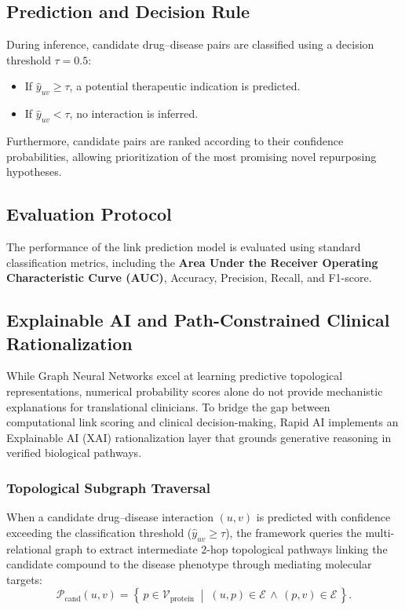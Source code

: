 \documentclass[conference,a4paper]{IEEEtran}
\begin{document}
\subsection{Prediction and Decision Rule}
During inference, candidate drug--disease pairs are classified using a decision threshold $\tau = 0.5$:
\begin{itemize}
    \item If $\hat{y}_{uv} \ge \tau$, a potential therapeutic indication is predicted.
    \item If $\hat{y}_{uv} < \tau$, no interaction is inferred.
\end{itemize}
Furthermore, candidate pairs are ranked according to their confidence probabilities, allowing prioritization of the most promising novel repurposing hypotheses.

\subsection{Evaluation Protocol}
The performance of the link prediction model is evaluated using standard classification metrics, including the \textbf{Area Under the Receiver Operating Characteristic Curve (AUC)}, Accuracy, Precision, Recall, and F1-score.

\subsection{Explainable AI and Path-Constrained Clinical Rationalization}
\label{sec:xai}
While Graph Neural Networks excel at learning predictive topological representations, numerical probability scores alone do not provide mechanistic explanations for translational clinicians. To bridge the gap between computational link scoring and clinical decision-making, Rapid AI implements an Explainable AI (XAI) rationalization layer that grounds generative reasoning in verified biological pathways.

\subsubsection{Topological Subgraph Traversal}
When a candidate drug--disease interaction $(u, v)$ is predicted with confidence exceeding the classification threshold ($\hat{y}_{uv} \ge \tau$), the framework queries the multi-relational graph to extract intermediate 2-hop topological pathways linking the candidate compound to the disease phenotype through mediating molecular targets:
\begin{equation}
    \mathcal{P}_{\mathrm{cand}}(u, v) = \left\{\, p \in \mathcal{V}_{\mathrm{protein}} \;\middle|\; (u, p) \in \mathcal{E} \,\land\, (p, v) \in \mathcal{E} \,\right\}.
\end{equation}
\end{document}

